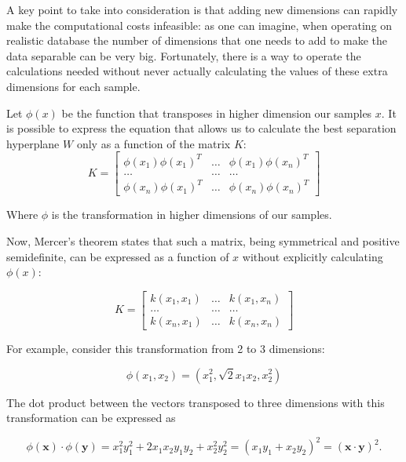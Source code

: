 \documentclass[a4paper]{report}
\begin{document}
A key point to take into consideration is that adding new dimensions can rapidly make the computational costs infeasible: as one can imagine, when operating on realistic database the number of dimensions that one needs to add to make the data separable can be very big.
Fortunately, there is a way to operate the calculations needed without never actually calculating the values of these extra dimensions for each sample.

Let $\phi (x)$ be the function that transposes in higher dimension our samples $x$. It is possible to express the equation that allows us to calculate the best separation hyperplane $W$ only as a function of the matrix $K$:
\begin{equation}
K =
	\begin{bmatrix}
		\phi (x_1) \phi(x_1)^T & \ldots & \phi (x_1) \phi(x_n)^T \\
		\ldots                 & \ldots & \ldots \\
		\phi (x_n) \phi(x_1)^T & \ldots & \phi (x_n) \phi(x_n)^T
	\end{bmatrix}
\end{equation}	

Where $\phi$ is the transformation in higher dimensions of our samples.

Now, Mercer's theorem states that such a matrix, being symmetrical and positive semidefinite, can be expressed as a function of $x$ without explicitly calculating $\phi (x)$: 

\begin{equation}
K =
\begin{bmatrix}
	k(x_1, x_1) & \ldots & k(x_1, x_n) \\
	\ldots                 & \ldots & \ldots \\
	k(x_n, x_1) & \ldots & k(x_n, x_n)
\end{bmatrix}
\end{equation}

For example, consider this transformation from 2 to 3 dimensions:

\begin{equation}
	\phi (x_1, x_2) = (x_1^2, \sqrt 2 x_1x_2, x_2^2)
\end{equation}

The dot product between the vectors transposed to three dimensions with this transformation can be expressed as

\begin{equation}
	\phi(\textbf{x}) \cdot \phi(\textbf{y}) = x_1^2y_1^2 + 2x_1x_2y_1y_2 + x_2^2y_2^2 = (x_1y_1+x_2y_2)^2 = (\textbf{x} \cdot \textbf{y})^2.
\end{equation}
\end{document}
